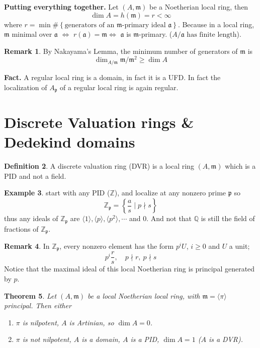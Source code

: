 \documentclass[11pt,a4paper]{article}
\theoremstyle{definition}
\newtheorem{definition}{Definition}[section]
\newtheorem{example}[definition]{Example}
\newtheorem{remark}[definition]{Remark}
\theoremstyle{plain}
\newtheorem{theorem}[definition]{Theorem}
\theoremstyle{remark}
\newcommand{\Z}{\mathbb{Z}}
\newcommand{\Q}{\mathbb{Q}}
\renewcommand{\set}[1]{\left\{ #1 \right\}}
\newcommand{\angles}[1]{\langle #1 \rangle}
\begin{document}
\textbf{Putting everything together.} Let $(A, \mathfrak{m})$ be a Noetherian local ring, then 
$$\dim A  = h(\mathfrak{m}) = r < \infty$$
where $r = \min \#\set{\text{generators of an $\mathfrak{m}$-primary ideal $\mathfrak{a}$}}$. Because in a local ring, $\mathfrak{m}$ minimal over $\mathfrak{a}$ 
$\iff$ $r(\mathfrak{a}) = \mathfrak{m} \iff $ $\mathfrak{a}$ is $\mathfrak{m}$-primary. ($A/\mathfrak{a} \text{ has finite length}$). 

\begin{remark}
    By Nakayama's Lemma, the minimum number of generators of $\mathfrak{m}$ is 
    $$\dim_{A/\mathfrak{m}} \mathfrak{m}/\mathfrak{m}^2 \ge \dim A$$ 
\end{remark}

\textbf{Fact.} A regular local ring is a domain, in fact it is a UFD. In fact the localization of $A_\mathfrak{p}$ of a regular local ring is again regular. 

\section{Discrete Valuation rings \& Dedekind domains} 

\begin{definition}
    A discrete valuation ring (DVR) is a local ring $(A, \mathfrak{m})$ which is a PID and not a field.
\end{definition}

\begin{example}
    start with any PID ($\Z$), and localize at any nonzero prime $\mathfrak{p}$ so 
    $$\Z_{\mathfrak{p}} = \set{\frac{a}{s} \mid p \nmid s}$$
    thus any ideals of $\Z_\mathfrak{p}$ are $\angles{1}, \angles{p}, \angles{p^2}, \cdots$ and $0$. And not that $\Q$ 
    is still the field of fractions of $\Z_\mathfrak{p}$.
\end{example}

\begin{remark}
    In $\Z_\mathfrak{p}$, every nonzero element has the form $p^i U$, $i \ge 0$ and $U$ a unit; 
    $$p^i \frac{r}{s}, \quad p \nmid r, \ p \nmid s$$
    Notice that the maximal ideal of this local Noetherian ring is principal generated by $p$. 
\end{remark}

\begin{theorem}
    Let $(A,\mathfrak{m})$ be a local Noetherian local ring, with $\mathfrak{m} = \angles{\pi}$ principal. Then either 
    \begin{enumerate}
        \item $\pi$ is nilpotent, $A$ is Artinian, so $\dim A = 0$. 
        \item $\pi$ is not nilpotent, $A$ is a domain, $A$ is a PID, $\dim A = 1$ ($A$ is a DVR).
    \end{enumerate}
\end{theorem}
\end{document}
